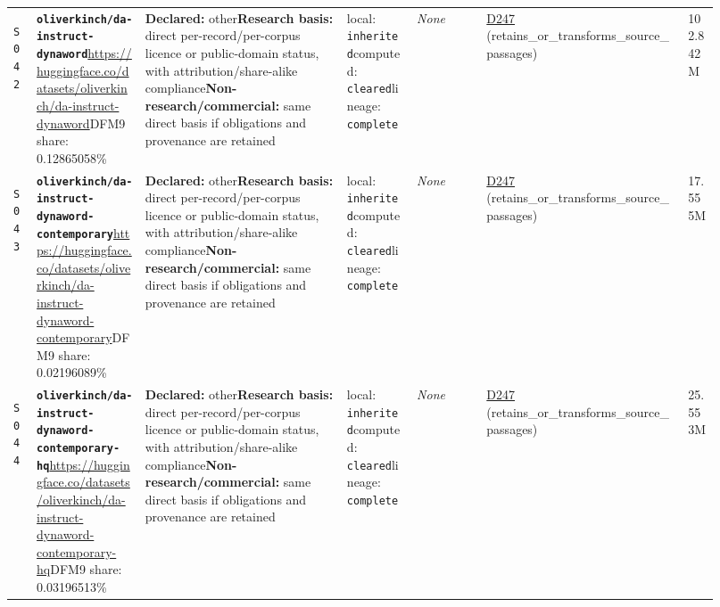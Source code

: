 \documentclass[9pt,a4paper]{article}
\newcommand{\srcid}[1]{\hypertarget{src:#1}{\texttt{#1}}}
\begin{document}
\begin{landscape}
\begin{longtable}{@{}L{0.03\linewidth}L{0.14\linewidth}L{0.26\linewidth}L{0.09\linewidth}L{0.09\linewidth}L{0.265\linewidth}L{0.045\linewidth}@{}}
\srcid{S042} & \textbf{\nolinkurl{oliverkinch/da-instruct-dynaword}}\newline \url{https://huggingface.co/datasets/oliverkinch/da-instruct-dynaword}\newline DFM9 share: 0.12865058\% & \textbf{Declared:} other\newline \textbf{Research basis:} direct per-record/per-corpus licence or public-domain status, with attribution/share-alike compliance\newline \textbf{Non-research/commercial:} same direct basis if obligations and provenance are retained & local: \texttt{inherited}\newline computed: \texttt{cleared}\newline lineage: \texttt{complete} & \textit{None} & \hyperlink{dep:D247}{D247} (retains\_or\_transforms\_source\_passages) & 102.842M \\
\srcid{S043} & \textbf{\nolinkurl{oliverkinch/da-instruct-dynaword-contemporary}}\newline \url{https://huggingface.co/datasets/oliverkinch/da-instruct-dynaword-contemporary}\newline DFM9 share: 0.02196089\% & \textbf{Declared:} other\newline \textbf{Research basis:} direct per-record/per-corpus licence or public-domain status, with attribution/share-alike compliance\newline \textbf{Non-research/commercial:} same direct basis if obligations and provenance are retained & local: \texttt{inherited}\newline computed: \texttt{cleared}\newline lineage: \texttt{complete} & \textit{None} & \hyperlink{dep:D247}{D247} (retains\_or\_transforms\_source\_passages) & 17.555M \\
\srcid{S044} & \textbf{\nolinkurl{oliverkinch/da-instruct-dynaword-contemporary-hq}}\newline \url{https://huggingface.co/datasets/oliverkinch/da-instruct-dynaword-contemporary-hq}\newline DFM9 share: 0.03196513\% & \textbf{Declared:} other\newline \textbf{Research basis:} direct per-record/per-corpus licence or public-domain status, with attribution/share-alike compliance\newline \textbf{Non-research/commercial:} same direct basis if obligations and provenance are retained & local: \texttt{inherited}\newline computed: \texttt{cleared}\newline lineage: \texttt{complete} & \textit{None} & \hyperlink{dep:D247}{D247} (retains\_or\_transforms\_source\_passages) & 25.553M \\

\end{longtable}
\end{landscape}
\end{document}
